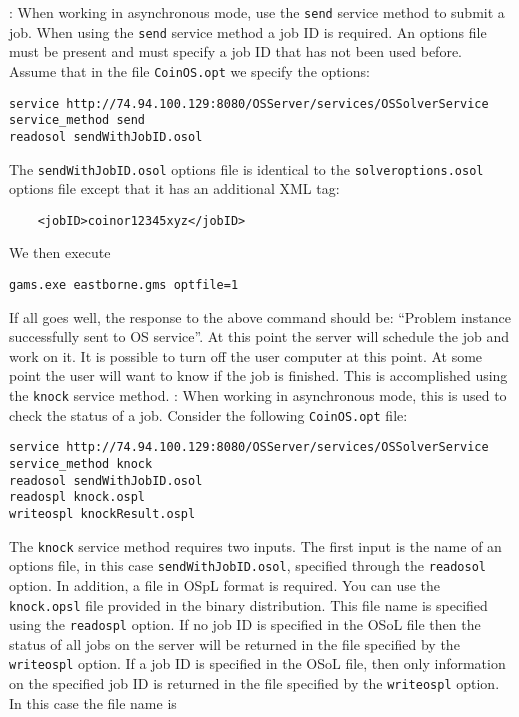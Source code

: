 \vskip 8pt
: When working in asynchronous mode, use the {\tt send} service method 
to submit a job. When using  the {\tt send} service method a job ID is required. An options file
must be present and must specify a  job ID that has not been used before.  Assume that in the file {\tt CoinOS.opt}  we specify 
the options:
\vskip 8pt
\begin{verbatim}
service http://74.94.100.129:8080/OSServer/services/OSSolverService
service_method send
readosol sendWithJobID.osol
\end{verbatim}
The {\tt sendWithJobID.osol} options file is identical to the {\tt solveroptions.osol} options file except 
that it has an additional XML tag:
\begin{verbatim}
    <jobID>coinor12345xyz</jobID> 
\end{verbatim}
We then execute
\vskip 8pt
\begin{verbatim}
gams.exe eastborne.gms optfile=1
\end{verbatim}
If all goes well, the response to the above command should  be: 
``Problem instance successfully sent to OS service''. 
At this point the server will schedule the job and work on it. It is possible to turn off 
the user computer at this point. At some point the user will want to know if the job is finished. 
This is accomplished using the {\tt knock} service method.
\vskip 8pt
: When working in asynchronous mode, this is used to check the status 
of a job.  Consider the following {\tt CoinOS.opt} file:
\vskip 8pt
\begin{verbatim}
service http://74.94.100.129:8080/OSServer/services/OSSolverService
service_method knock
readosol sendWithJobID.osol 
readospl knock.ospl
writeospl knockResult.ospl
\end{verbatim}
The {\tt knock} service method requires two  inputs. The first input is the name of an options file, 
in this case {\tt sendWithJobID.osol}, specified through the {\tt readosol} option. In addition, a file 
in OSpL format is required. You can use the {\tt knock.opsl} file provided in the binary distribution. 
This file name is specified using the {\tt readospl} option. If no job ID is specified in the OSoL file 
then the status of all jobs on the server will be returned in the file specified by the {\tt writeospl} 
option. If a job ID is specified in the OSoL file, then only information on the specified job ID is 
returned in the file specified by the {\tt writeospl} option.  In this case the file name is 
